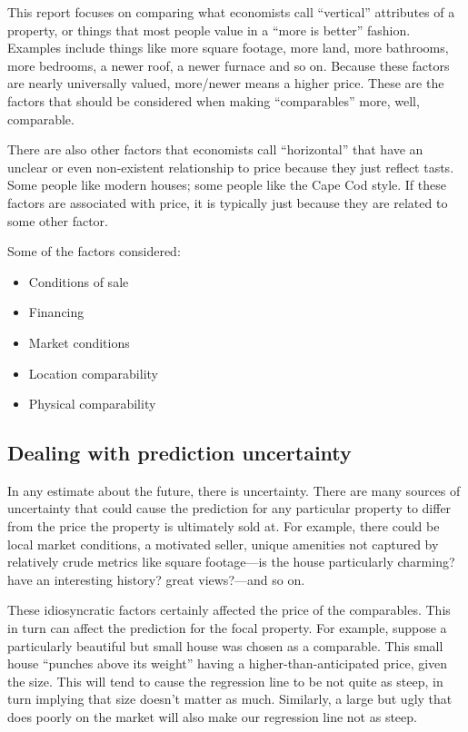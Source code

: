 \documentclass[
12pt, %
letterpaper, %
oneside, %
headinclude,footinclude, %
BCOR5mm, %
]{scrartcl}
\begin{document}
This report focuses on comparing what economists call ``vertical'' attributes of a property, or things that most people value in a ``more is better'' fashion.
Examples include things like more square footage, more land, more bathrooms, more bedrooms, a newer roof, a newer furnace and so on.
Because these factors are nearly universally valued, more/newer means a higher price.
These are the factors that should be considered when making ``comparables'' more, well, comparable. 

There are also other factors that economists call ``horizontal'' that have an unclear or even non-existent relationship to price because they just reflect tasts.  
Some people like modern houses; some people like the Cape Cod style.
If these factors are associated with price, it is typically just because they are related to some other factor.

Some of the factors considered: 
\begin{itemize}
\item Conditions of sale
\item Financing
\item Market conditions
\item Location comparability
\item Physical comparability 
\end{itemize}

\subsection{Dealing with prediction uncertainty}  \label{sec:bootstrapping} 
In any estimate about the future, there is uncertainty.
There are many sources of uncertainty that could cause the prediction for any particular property to differ from the price the property is ultimately sold at.
For example, there could be local market conditions, a motivated seller, unique amenities not captured by relatively crude metrics like square footage---is the house particularly charming? have an interesting history? great views?---and so on. 

These idiosyncratic factors certainly affected the price of the comparables.
This in turn can affect the prediction for the focal property. 
For example, suppose a particularly beautiful but small house was chosen as a comparable.
This small house ``punches above its weight'' having a higher-than-anticipated price, given the size.
This will tend to cause the regression line to be not quite as steep, in turn implying that size doesn't matter as much.
Similarly, a large but ugly that does poorly on the market will also make our regression line not as steep.
\end{document}
